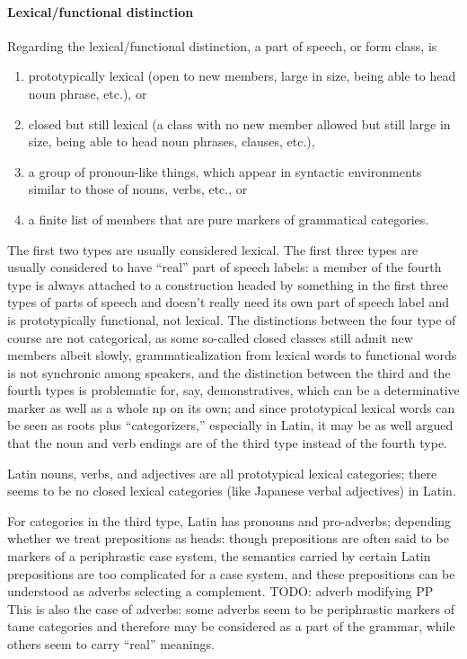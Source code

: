 \documentclass[a4paper, oneside, 12pt]{report}
\begin{document}
\paragraph*{Lexical/functional distinction}

Regarding the lexical/functional distinction,
a part of speech, or form class, is 
\begin{enumerate}
    \item prototypically lexical 
    (open to new members, large in size, being able to head noun phrase, etc.), or
    \item closed but still lexical 
    (a class with no new member allowed but still large in size, being able to head noun phrases, clauses, etc.),
    \item a group of pronoun-like things, which appear in syntactic environments similar to those of nouns, verbs, etc., or
    \item a finite list of members that are pure markers of grammatical categories.
\end{enumerate}
The first two types are usually considered lexical.
The first three types are usually considered to have 
``real'' part of speech labels: 
a member of the fourth type is always attached to a construction headed by 
something in the first three types of parts of speech
and doesn't really need its own part of speech label and is prototypically functional, not lexical.
The distinctions between the four type of course are not categorical,
as some so-called closed classes still admit new members albeit slowly,
grammaticalization from lexical words to functional words is not synchronic among speakers, 
and the distinction between the third and the fourth types 
is problematic for, say, demonstratives, 
which can be a determinative marker as well as a whole \acs{np} on its own; 
and since prototypical lexical words can be seen as roots plus ``categorizers,'' 
especially in Latin,
it may be as well argued that the noun and verb endings are of the third type
instead of the fourth type.

Latin nouns, verbs, and adjectives are all prototypical lexical categories;
there seems to be no closed lexical categories (like Japanese verbal adjectives) in Latin.

For categories in the third type,
Latin has pronouns and pro-adverbs; 
depending whether we treat prepositions as heads:
though prepositions are often said to be markers of a periphrastic case system,
the semantics carried by certain Latin prepositions are too complicated for a case system,
and these prepositions can be understood as adverbs selecting a complement.
TODO: adverb modifying PP  
This is also the case of adverbs:
some adverbs seem to be periphrastic markers of \acs{tame} categories
and therefore may be considered as a part of the grammar,
while others seem to carry ``real'' meanings.
\end{document}
